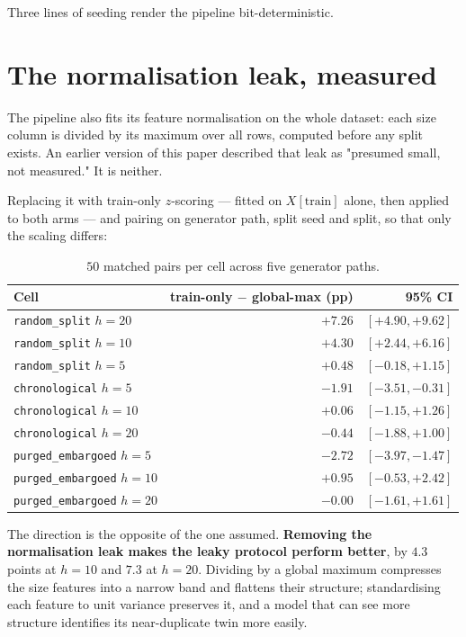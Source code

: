 \documentclass[11pt,a4paper]{article}
\begin{document}
Three lines of seeding render the pipeline bit-deterministic.

\section{The normalisation leak, measured}

The pipeline also fits its feature normalisation on the whole dataset: each size
column is divided by its maximum over all rows, computed before any split
exists. An earlier version of this paper described that leak as "presumed small,
not measured." It is neither.

Replacing it with train-only $z$-scoring --- fitted on $X[\text{train}]$ alone,
then applied to both arms --- and pairing on generator path, split seed and
split, so that only the scaling differs:

\begin{table}[h]
\centering
\small
\begin{tabular}{lrr}
\toprule
Cell & train-only $-$ global-max (pp) & 95\% CI \\
\midrule
\texttt{random\_split} $h{=}20$ & $\mathbf{+7.26}$ & $[+4.90, +9.62]$ \\
\texttt{random\_split} $h{=}10$ & $\mathbf{+4.30}$ & $[+2.44, +6.16]$ \\
\texttt{random\_split} $h{=}5$ & $+0.48$ & $[-0.18, +1.15]$ \\
\addlinespace
\texttt{chronological} $h{=}5$ & $-1.91$ & $[-3.51, -0.31]$ \\
\texttt{chronological} $h{=}10$ & $+0.06$ & $[-1.15, +1.26]$ \\
\texttt{chronological} $h{=}20$ & $-0.44$ & $[-1.88, +1.00]$ \\
\addlinespace
\texttt{purged\_embargoed} $h{=}5$ & $-2.72$ & $[-3.97, -1.47]$ \\
\texttt{purged\_embargoed} $h{=}10$ & $+0.95$ & $[-0.53, +2.42]$ \\
\texttt{purged\_embargoed} $h{=}20$ & $-0.00$ & $[-1.61, +1.61]$ \\
\bottomrule
\end{tabular}
\caption{$50$ matched pairs per cell across five generator paths.}
\end{table}

The direction is the opposite of the one assumed. \textbf{Removing the
normalisation leak makes the leaky protocol perform better}, by $4.3$ points at
$h{=}10$ and $7.3$ at $h{=}20$. Dividing by a global maximum compresses the size
features into a narrow band and flattens their structure; standardising each
feature to unit variance preserves it, and a model that can see more structure
identifies its near-duplicate twin more easily.
\end{document}
